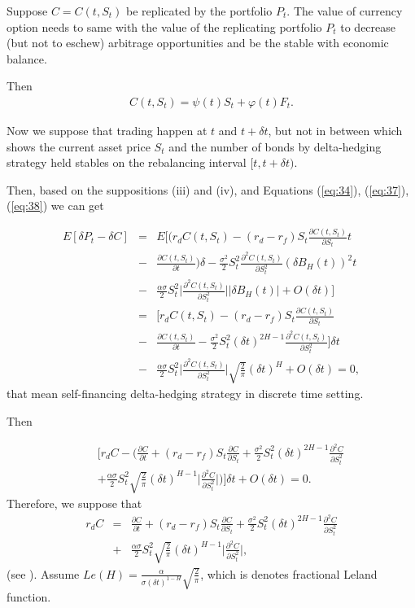 \documentclass[a4paper,11pt]{amsart}
\numberwithin{equation}{section}
\theoremstyle{definition}
\theoremstyle{plain}
\theoremstyle{definition}
\newcommand{\1}{\mathbf{1}}
\begin{document}
 Suppose $C=C(t,S_t)$ be replicated by the portfolio $P_t$. The value of currency option needs to same with  the value of the replicating portfolio $P_t$ to decrease (but not to eschew) arbitrage opportunities and be the stable  with economic balance.

Then \begin{eqnarray}
C(t,S_t)=\psi(t)S_t+\varphi(t)F_t  .
\label{eq:38}
\end{eqnarray}

Now we suppose that trading happen at $t$ and $t+\delta t$, but not in between which shows  the current asset price $S_t$ and the number of bonds by delta-hedging strategy held stables on the rebalancing interval $[t,t+\delta t)$.

Then, based on the suppositions (iii) and (iv), and Equations (\ref{eq:34}), (\ref{eq:37}), (\ref{eq:38}) we can get

\begin{eqnarray}
E[\delta P_t-\delta C]&=&E\Big[\Big(r_dC(t,S_t)-(r_d-r_f)S_t\frac{\partial C(t,S_t)}{\partial S_t}t\nonumber\\
&-&\frac{\partial C(t,S_t)}{\partial t}\Big)\delta -\frac{\sigma^2}{2}S_t^2\frac{\partial^2 C(t,S_t)}{\partial S_t^2}(\delta B_H(t))^2t\nonumber\\
&-&\frac{\alpha \sigma}{2}S_t^2\Big|\frac{\partial^2C(t,S_t)}{\partial S_t^2}\Big||\delta B_H(t)|+O(\delta t)\Big]\nonumber\\
&=&\Big[r_dC(t,S_t)-(r_d-r_f)S_t\frac{\partial C(t,S_t)}{\partial S_t}\nonumber\\
&-&\frac{\partial C(t,S_t)}{\partial t}-\frac{\sigma^2}{2}S_t^2(\delta t)^{2H-1}\frac{\partial^2 C(t,S_t)}{\partial S_t^2}\Big]\delta t\nonumber\\
&-&\frac{\alpha \sigma}{2}S_t^2\Big|\frac{\partial^2C(t,S_t)}{\partial S_t^2}\Big|\sqrt{\frac{2}{\pi}}(\delta t)^{H}+O(\delta t)=0,
\label{eq:39}
\end{eqnarray}
that mean self-financing delta-hedging strategy in discrete time setting.

Then

\begin{eqnarray}
&&\Big[r_dC-\Big(\frac{\partial C}{\partial t}+(r_d-r_f)S_t\frac{\partial C}{\partial S_t}+\frac{\sigma^2}{2}S_t^2(\delta t)^{2H-1}\frac{\partial^2 C}{\partial S_t^2}\nonumber\\
&&+\frac{\alpha \sigma}{2}S_t^2\sqrt{\frac{2}{\pi}}(\delta t)^{H-1}\Big|\frac{\partial^2C}{\partial S_t^2}\Big|\Big)\Big]\delta t+O(\delta t)=0.
\label{eq:40}
\end{eqnarray}
Therefore, we suppose that
\begin{eqnarray}
r_dC&=&\frac{\partial C}{\partial t}+(r_d-r_f)S_t\frac{\partial C}{\partial S_t}+\frac{\sigma^2}{2}S_t^2(\delta t)^{2H-1}\frac{\partial^2 C}{\partial S_t^2}\nonumber\\
&+&\frac{\alpha \sigma}{2}S_t^2\sqrt{\frac{2}{\pi}}(\delta t)^{H-1}\Big|\frac{\partial^2C}{\partial S_t^2}\Big|,
\label{eq:41}
\end{eqnarray}
(see \cite{leland}).
 Assume $Le(H)=\frac{\alpha}{\sigma(\delta t)^{1-H}}\sqrt{\frac{2}{\pi}}$, which is denotes fractional Leland function.
\end{document}
